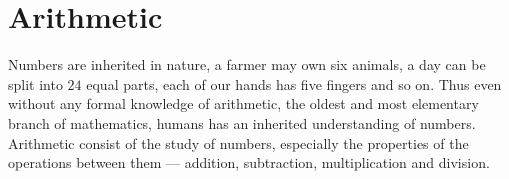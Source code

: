 \chapter{Arithmetic}\label{arit}





Numbers are inherited in nature, a farmer may own six animals, a day can be split into $24$ equal parts, each of our hands has five fingers and so on. Thus even without any formal knowledge of arithmetic, the oldest and most elementary branch of mathematics, humans has an inherited understanding of numbers. Arithmetic consist of the study of numbers, especially the properties of the operations between them — addition, subtraction, multiplication and division.

